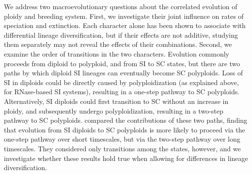 We address two macroevolutionary questions about the correlated evolution of ploidy and breeding system.
First, we investigate their joint influence on rates of speciation and extinction.
Each character alone has been shown to associate with differential lineage diversification, but if their effects are not additive, studying them separately may not reveal the effects of their combinations.
Second, we examine the order of transitions in the two characters.
Evolution commonly proceeds from diploid to polyploid, and from SI to SC states, but there are two paths by which diploid SI lineages can eventually become SC polyploids.
Loss of SI in diploids could be directly caused by polyploidization (as explained above, for RNase-based SI systems), resulting in a one-step pathway to SC polyploids. 
Alternatively, SI diploids could first transition to SC without an increase in ploidy, and subsequently undergo polyploidization, resulting in a two-step pathway to SC polyploids.
\citet{robertson_2011} compared the contributions of these two paths, finding that evolution from SI diploids to SC polyploids is more likely to proceed via the one-step pathway over short timescales, but via the two-step pathway over long timescales.
They considered only transitions among the states, however, and we investigate whether these results hold true when allowing for differences in lineage diversification.

